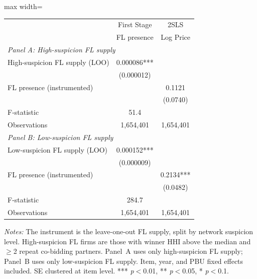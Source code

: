 \caption{IV Estimates by FL Suspicion Level (Network Split)}
\label{tab:iv_network_split}
\begin{adjustbox}{max width=\textwidth}
\begin{threeparttable}
\small
\begin{tabular}{lcc}
\toprule
 & First Stage & 2SLS \\
 & FL presence & Log Price \\
\midrule
\multicolumn{3}{l}{\textit{Panel A: High-suspicion FL supply}} \\[3pt]
High-suspicion FL supply (LOO) & 0.000086*** & \\
 & (0.000012) & \\
FL presence (instrumented) & & 0.1121 \\
 & & (0.0740) \\
F-statistic & 51.4 & \\
Observations & 1,654,401 & 1,654,401 \\
\midrule
\multicolumn{3}{l}{\textit{Panel B: Low-suspicion FL supply}} \\[3pt]
Low-suspicion FL supply (LOO) & 0.000152*** & \\
 & (0.000009) & \\
FL presence (instrumented) & & 0.2134*** \\
 & & (0.0482) \\
F-statistic & 284.7 & \\
Observations & 1,654,401 & 1,654,401 \\
\bottomrule
\end{tabular}
\begin{tablenotes}
\small
\item \textit{Notes:} The instrument is the leave-one-out FL supply, split by
network suspicion level. High-suspicion FL firms are those with winner HHI above
the median and $\geq$2 repeat co-bidding partners. Panel~A uses only
high-suspicion FL supply; Panel~B uses only low-suspicion FL supply. Item, year,
and PBU fixed effects included. SE clustered at item level.
*** \textit{p}$<$0.01, ** \textit{p}$<$0.05, * \textit{p}$<$0.1.
\end{tablenotes}
\end{threeparttable}
\end{adjustbox}
